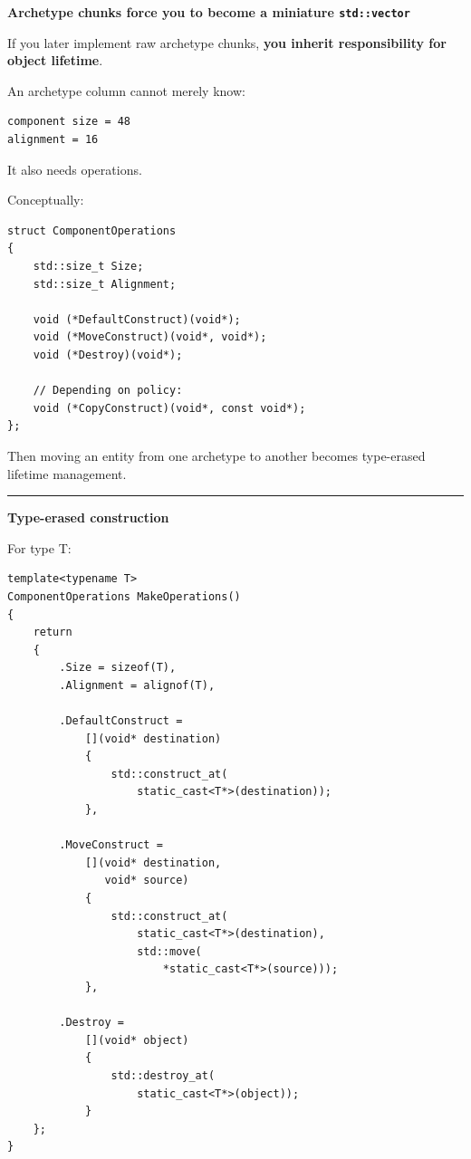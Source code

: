 \textbf{Archetype chunks force you to become a miniature \texttt{std::vector}}

If you later implement raw archetype chunks, \textbf{you inherit responsibility for object lifetime}.

An archetype column cannot merely know:

\begin{verbatim}
component size = 48
alignment = 16
\end{verbatim}

It also needs operations.

Conceptually:

\begin{verbatim}
struct ComponentOperations
{
    std::size_t Size;
    std::size_t Alignment;

    void (*DefaultConstruct)(void*);
    void (*MoveConstruct)(void*, void*);
    void (*Destroy)(void*);

    // Depending on policy:
    void (*CopyConstruct)(void*, const void*);
};
\end{verbatim}

Then moving an entity from one archetype to another becomes type-erased lifetime management.

\begin{center}\rule{0.5\linewidth}{0.5pt}\end{center}

\textbf{Type-erased construction}

For type T:

\begin{verbatim}
template<typename T>
ComponentOperations MakeOperations()
{
    return
    {
        .Size = sizeof(T),
        .Alignment = alignof(T),

        .DefaultConstruct =
            [](void* destination)
            {
                std::construct_at(
                    static_cast<T*>(destination));
            },

        .MoveConstruct =
            [](void* destination,
               void* source)
            {
                std::construct_at(
                    static_cast<T*>(destination),
                    std::move(
                        *static_cast<T*>(source)));
            },

        .Destroy =
            [](void* object)
            {
                std::destroy_at(
                    static_cast<T*>(object));
            }
    };
}
\end{verbatim}

